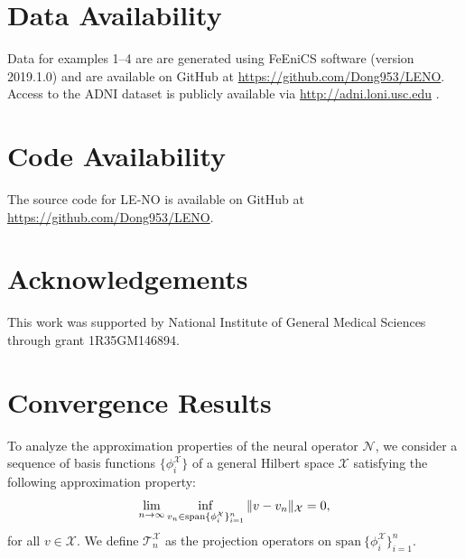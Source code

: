 \documentclass[preprint,12pt]{elsarticle}
\theoremstyle{plain}
\numberwithin{figure}{section}
\numberwithin{table}{section}
\begin{document}
\section*{Data Availability}
Data for examples 1--4 are are generated using FeEniCS software (version 2019.1.0) and are available on GitHub at \href{https://github.com/Dong953/LENO}{https://github.com/Dong953/LENO}. Access to the ADNI dataset is publicly available via \href{http://adni.loni.usc.edu}{http://adni.loni.usc.edu} \cite{weiner2013alzheimer}.
\section*{Code Availability}
The source code for LE-NO is available on GitHub at \href{https://github.com/Dong953/LENO}{https://github.com/Dong953/LENO}.



\section*{Acknowledgements}
This work was supported by National Institute of General Medical Sciences through grant 1R35GM146894.
















\appendix
\renewcommand{\thetheorem}{\Alph{section}.\arabic{theorem}}
\renewcommand{\thetheorem}{\Alph{section}.\arabic{theorem}}
\renewcommand{\theremark}{\Alph{section}.\arabic{remark}}
\renewcommand{\thelemma}{\Alph{section}.\arabic{lemma}}
\renewcommand{\theequation}{\Alph{section}.\arabic{equation}}
\section{Convergence Results}\label{appdendix:approx}
To analyze the approximation properties of the neural operator $\mathcal{N}$, we consider a sequence of basis functions  $\{\phi_i^{\mathcal{X}}\}$ of a general Hilbert space $\mathcal{X}$ satisfying the following approximation property:
\begin{equation}
	\lim_{n\rightarrow\infty} \inf_{v_n\in {\rm span}\{\phi_i^{\mathcal{X}}\}_{i=1}^n} \|v-v_n\|_{\mathcal{X}} = 0,
\end{equation}
for all $v\in {\mathcal{X}}$. We define $\mathcal{T}_n^\mathcal{X}$ as the projection operators on $\text{span}~\{\phi_i^\mathcal{X}\}_{i=1}^n$.
\end{document}
